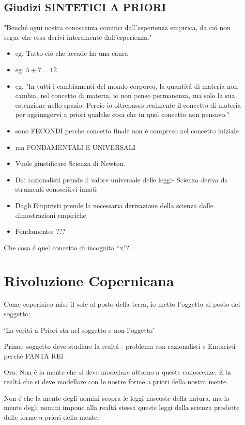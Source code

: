 \documentclass{article}
\begin{document}
\subsection{Giudizi SINTETICI A PRIORI}

"Benché ogni nostra conoscenza cominci dall'esperienza empirica, da ció non segue che essa derivi interamente dall'esperienza."
\begin{itemize}
    \item eg. Tutto ció che accade ha una causa
    \item eg. $5+7=12$
    \item eg. "In tutti i cambiamenti del mondo corporeo, la quantitá di materia non cambia. nel concetto di materia, io non penso permanenza, ma solo la sua estenzione nello spazio. Percio io oltrepasso realmente il concetto di materia  per aggiungervi a priori qualche cosa che in quel concetto non pensavo."
    \item sono FECONDI perche concetto finale non é compreso nel concetto iniziale
    \item ma FONDAMENTALI E UNIVERSALI
    \item Vuole giustificare Scienza di Newton.
    \item Dai razionalisti prende il valore universale delle leggi- Scienza deriva da strumenti conoscitivi innati
    \item Dagli Empiristi prende la necessaria derivazione della scienza dalle dimostrazioni empiriche
    \item Fondamento: ???
\end{itemize}
    
Che cosa é quel concetto di incognita ``x"?...

\section{Rivoluzione Copernicana}
Come coperinico mise il sole al posto della terra, io metto l'oggetto al posto del soggetto:

`La veritá a Priori sta nel soggetto e non l'oggetto'

Prima: soggetto deve studiare la realtá - problema con razionalisti e Empiristi perché PANTA REI

Ora: Non é la mente che si deve modellare attorno a queste conoscenze. É la realtá che si deve modellare con le nostre forme a priori della nostra mente.

Non é che la mente degli uomini scopra le leggi nascoste della natura, ma la mente degli uomini impone alla realtá stessa queste leggi della scienza prodotte dalle forme a priori della mente.
\end{document}
